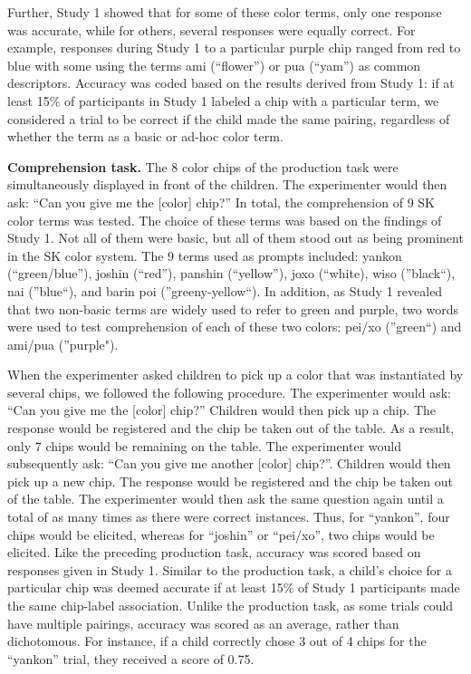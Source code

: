 \documentclass[
  english,
  ,man,floatsintext]{apa6}
\begin{document}
Further, Study 1 showed that for some of these color terms, only one response was accurate, while for others, several responses were equally correct. For example, responses during Study 1 to a particular purple chip ranged from red to blue with some using the terms ami (\enquote{flower}) or pua (\enquote{yam}) as common descriptors. Accuracy was coded based on the results derived from Study 1: if at least 15\% of participants in Study 1 labeled a chip with a particular term, we considered a trial to be correct if the child made the same pairing, regardless of whether the term as a basic or ad-hoc color term.

\textbf{Comprehension task.} The 8 color chips of the production task were simultaneously displayed in front of the children. The experimenter would then ask: \enquote{Can you give me the {[}color{]} chip?} In total, the comprehension of 9 SK color terms was tested. The choice of these terms was based on the findings of Study 1. Not all of them were basic, but all of them stood out as being prominent in the SK color system. The 9 terms used as prompts included: yankon (\enquote{green/blue}), joshin (\enquote{red}), panshin (\enquote{yellow}), joxo (\enquote{white), wiso (}black\enquote{), nai (}blue\enquote{), and barin poi (}greeny-yellow\enquote{). In addition, as Study 1 revealed that two non-basic terms are widely used to refer to green and purple, two words were used to test comprehension of each of these two colors: pei/xo (}green\enquote{) and ami/pua (}purple").

When the experimenter asked children to pick up a color that was instantiated by several chips, we followed the following procedure. The experimenter would ask: \enquote{Can you give me the {[}color{]} chip?} Children would then pick up a chip. The response would be registered and the chip be taken out of the table. As a result, only 7 chips would be remaining on the table. The experimenter would subsequently ask: \enquote{Can you give me another {[}color{]} chip?}. Children would then pick up a new chip. The response would be registered and the chip be taken out of the table. The experimenter would then ask the same question again until a total of as many times as there were correct instances. Thus, for \enquote{yankon}, four chips would be elicited, whereas for \enquote{joshin} or \enquote{pei/xo}, two chips would be elicited. Like the preceding production task, accuracy was scored based on responses given in Study 1. Similar to the production task, a child's choice for a particular chip was deemed accurate if at least 15\% of Study 1 participants made the same chip-label association. Unlike the production task, as some trials could have multiple pairings, accuracy was scored as an average, rather than dichotomous. For instance, if a child correctly chose 3 out of 4 chips for the \enquote{yankon} trial, they received a score of 0.75.
\end{document}
